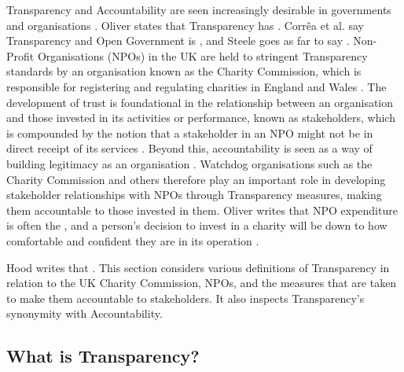 Transparency and Accountability are seen increasingly desirable in governments and organisations \cite{hood_accountability_2010, oliver_what_2004, heald_fiscal_2003}. Oliver states that Transparency has  \cite{oliver_what_2004}.  Corr\^ea et al. say Transparency and Open Government is  \cite{correa_really_2014}, and Steele goes as far to say  \cite{steele_open-source_2012}.
%
Non-Profit Organisations (NPOs) in the UK are held to stringent Transparency standards by an organisation known as the Charity Commission, which is responsible for registering and regulating charities in England and Wales  \cite{hm_government_charity_????}. The development of trust is foundational in the relationship between an organisation and those invested in its activities or performance, known as stakeholders, which is compounded by the notion that a stakeholder in an NPO might not be in direct receipt of its services \cite{macmillan_relationship_2005, krashinsky_stakeholder_1997}. Beyond this, accountability is seen as a way of building legitimacy as an organisation \cite{anheier_accountability_2009}. Watchdog organisations such as the Charity Commission and others therefore play an important role in developing stakeholder relationships with NPOs through Transparency measures, making them accountable to those invested in them. Oliver writes that NPO expenditure is often the , and a person's decision to invest in a charity will be down to how comfortable and confident they are in its operation \cite{oliver_what_2004}.


Hood writes that  \cite{hood_transparency_2006-1}. This section considers various definitions of Transparency in relation to the UK Charity Commission, NPOs, and the measures that are taken to make them accountable to stakeholders. It also inspects Transparency's synonymity with Accountability.

\subsection{What is Transparency?}

